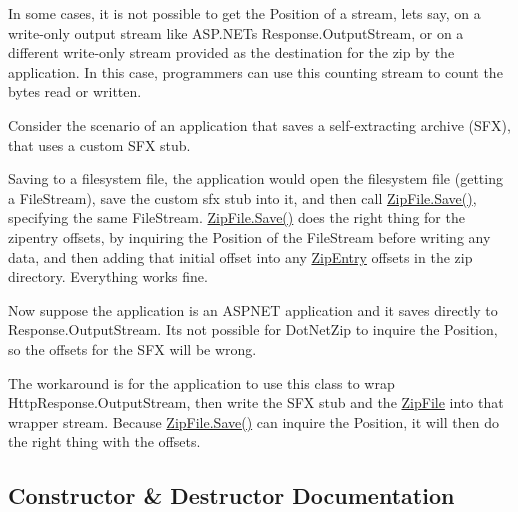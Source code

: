 In some cases, it is not possible to get the Position of a stream, let\textquotesingle{}s say, on a write-\/only output stream like A\+S\+P.\+N\+ET\textquotesingle{}s {\ttfamily Response.\+Output\+Stream}, or on a different write-\/only stream provided as the destination for the zip by the application. In this case, programmers can use this counting stream to count the bytes read or written. 

Consider the scenario of an application that saves a self-\/extracting archive (S\+FX), that uses a custom S\+FX stub. 

Saving to a filesystem file, the application would open the filesystem file (getting a {\ttfamily File\+Stream}), save the custom sfx stub into it, and then call {\ttfamily \mbox{\hyperlink{class_super_tiled2_unity_1_1_ionic_1_1_zip_1_1_zip_file_aff8f1b3d07b66481e2629b04017a056f}{Zip\+File.\+Save()}}}, specifying the same File\+Stream. {\ttfamily \mbox{\hyperlink{class_super_tiled2_unity_1_1_ionic_1_1_zip_1_1_zip_file_aff8f1b3d07b66481e2629b04017a056f}{Zip\+File.\+Save()}}} does the right thing for the zipentry offsets, by inquiring the Position of the {\ttfamily File\+Stream} before writing any data, and then adding that initial offset into any \mbox{\hyperlink{class_super_tiled2_unity_1_1_ionic_1_1_zip_1_1_zip_entry}{Zip\+Entry}} offsets in the zip directory. Everything works fine. 

Now suppose the application is an A\+S\+P\+N\+ET application and it saves directly to {\ttfamily Response.\+Output\+Stream}. It\textquotesingle{}s not possible for Dot\+Net\+Zip to inquire the {\ttfamily Position}, so the offsets for the S\+FX will be wrong. 

The workaround is for the application to use this class to wrap {\ttfamily Http\+Response.\+Output\+Stream}, then write the S\+FX stub and the \mbox{\hyperlink{class_super_tiled2_unity_1_1_ionic_1_1_zip_1_1_zip_file}{Zip\+File}} into that wrapper stream. Because {\ttfamily \mbox{\hyperlink{class_super_tiled2_unity_1_1_ionic_1_1_zip_1_1_zip_file_aff8f1b3d07b66481e2629b04017a056f}{Zip\+File.\+Save()}}} can inquire the {\ttfamily Position}, it will then do the right thing with the offsets. 

\subsection{Constructor \& Destructor Documentation}
\mbox{\label{class_super_tiled2_unity_1_1_ionic_1_1_zip_1_1_counting_stream_a3e2728e7a4ebd80bd540152e6a0c278d}} 
